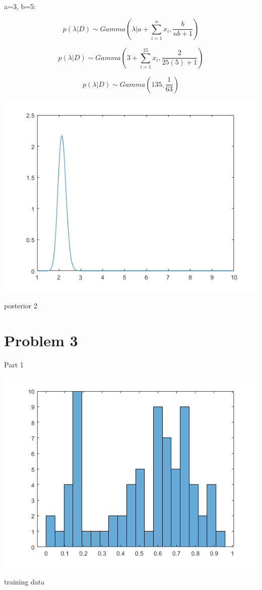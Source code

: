 \documentclass[a4paper]{article}
\begin{document}
a=3, b=5:

$$p(\lambda|D)\sim Gamma(\lambda |a+\sum_{i=1}^{n}x_i, \frac{b}{nb+1})$$

$$p(\lambda|D)\sim Gamma(3+\sum_{i=1}^{25}x_i, \frac{2}{25(5)+1})$$

$$p(\lambda|D)\sim Gamma(135, \frac{1}{63})$$

\begin{center}
    \includegraphics[scale=1]{2d-2.png}
    \caption{posterior 2}
\end{center}

\section{Problem 3}

Part 1
\begin{center}
    \includegraphics[scale=1]{3-1.png}
    \caption{training data}
\end{center}
\end{document}
